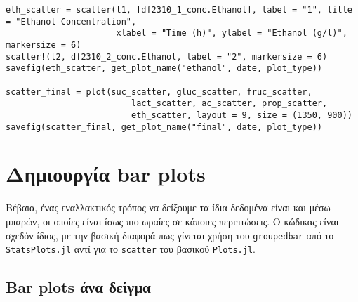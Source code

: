 \documentclass[11pt]{article}
\begin{document}
\begin{verbatim}
eth_scatter = scatter(t1, [df2310_1_conc.Ethanol], label = "1", title = "Ethanol Concentration",
                      xlabel = "Time (h)", ylabel = "Ethanol (g/l)", markersize = 6)
scatter!(t2, df2310_2_conc.Ethanol, label = "2", markersize = 6)
savefig(eth_scatter, get_plot_name("ethanol", date, plot_type))

scatter_final = plot(suc_scatter, gluc_scatter, fruc_scatter,
                         lact_scatter, ac_scatter, prop_scatter,
                         eth_scatter, layout = 9, size = (1350, 900))
savefig(scatter_final, get_plot_name("final", date, plot_type))

\end{verbatim}

\section{Δημιουργία bar plots}
\label{sec:org38b8140}
Βέβαια, ένας εναλλακτικός τρόπος να δείξουμε τα ίδια δεδομένα είναι και μέσω μπαρών, οι οποίες είναι ίσως πιο ωραίες σε κάποιες περιπτώσεις. Ο κώδικας είναι σχεδόν ίδιος, με την βασική διαφορά πως γίνεται χρήση του \texttt{groupedbar} από το \texttt{StatsPlots.jl} αντί για το \texttt{scatter} του βασικού \texttt{Plots.jl}. 

\subsection{Bar plots άνα δείγμα}
\label{sec:orge729fb4}
\end{document}
